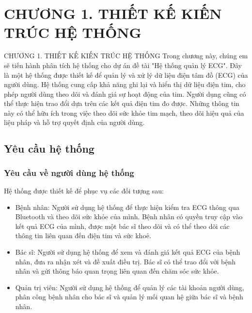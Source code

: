 
\section*{CHƯƠNG 1. THIẾT KẾ KIẾN TRÚC HỆ THỐNG }
\setcounter{section}{1}
\setcounter{subsection}{0} %
\setcounter{table}{0} %
\setcounter{figure}{0} %
{\numberline{}CHƯƠNG 1. THIẾT KẾ KIẾN TRÚC HỆ THỐNG}
Trong chương này, chúng em sẽ tiến hành phân tích hệ thống cho dự án đề tài "Hệ thống quản lý ECG". 
Đây là một hệ thống được thiết kế để quản lý và xử lý dữ liệu điện tâm đồ (ECG) của người dùng. 
Hệ thống cung cấp khả năng ghi lại và hiển thị dữ liệu điện tim, cho phép người dùng theo dõi và 
đánh giá sự hoạt động của tim. 
Người dụng cũng có thể thực hiện trao đổi dựa trên các kết quả điện tim đo được. 
Những thông tin này có thể hữu ích trong việc theo dõi sức khỏe tim mạch, theo dõi hiệu quả của liệu pháp 
và hỗ trợ quyết định của người dùng.



\subsection{Yêu cầu hệ thống}
\subsubsection{Yêu cầu về người dùng hệ thống}
Hệ thống được thiết kế để phục vụ các đối tượng sau:
\begin{itemize}
    \item Bệnh nhân: Người sử dụng hệ thống để thực hiện kiểm tra ECG thông qua Bluetooth và theo dõi sức khỏe của mình. Bệnh nhân có quyền truy cập vào kết quả ECG của mình, được một bác sĩ theo dõi và có thể theo dõi các thông tin liên quan đến điện tim và sức khoẻ.
    \item Bác sĩ: Người sử dụng hệ thống để xem và đánh giá kết quả ECG của bệnh nhân, đưa ra nhận xét và đề xuất điều trị. Bác sĩ có thể trao đổi với bệnh nhân và gửi thông báo quan trọng liên quan đến chăm sóc sức khỏe.
    \item Quản trị viên: Người sử dụng hệ thống để quản lý các tài khoản người dùng, phân công bệnh nhân cho bác sĩ và quản lý mối quan hệ giữa bác sĩ và bệnh nhân.
\end{itemize}


